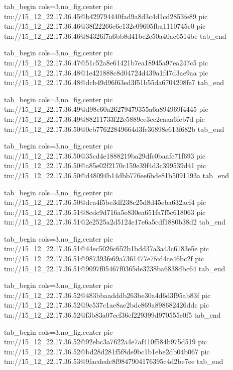  
 
 
 
 

\qqSecCmtScr


\ifcmt
  tab_begin cols=3,no_fig,center
    pic tm://15_12_22.17.36.45@b429794440fad9a8d3c4d1cd2853fe89
    pic tm://15_12_22.17.36.46@38f22266e6e132c09605fba1110745c0
    pic tm://15_12_22.17.36.46@84326f7a6bb8d41bc2c50a40ac6514be
  tab_end
\fi


\ifcmt
  tab_begin cols=3,no_fig,center
    pic tm://15_12_22.17.36.47@51c52a8e61421b7ea18945a97ea247c5
    pic tm://15_12_22.17.36.48@1e421888c8d04724d439a1f47d3ae9aa
    pic tm://15_12_22.17.36.48@dcb49d96f63ed3f51b55da6704208fe7
  tab_end
\fi


\ifcmt
  tab_begin cols=3,no_fig,center
    pic tm://15_12_22.17.36.49@d98c60a26279479355a6a894969f4445
    pic tm://15_12_22.17.36.49@88211733f22e5889ce3cc2caaa6feb7d
    pic tm://15_12_22.17.36.50@0cb77622849664d3fc36898e613f682b
  tab_end
\fi


\ifcmt
  tab_begin cols=3,no_fig,center
    pic tm://15_12_22.17.36.50@35cd4e1888219ba29dfc0baafc71f693
    pic tm://15_12_22.17.36.50@a85e02f2170c159e39f4d3c399539d41
    pic tm://15_12_22.17.36.50@d48094b14dbb776ee6bde81b5091193a
  tab_end
\fi


\ifcmt
  tab_begin cols=3,no_fig,center
    pic tm://15_12_22.17.36.50@dca4f5be3df238c25d8d45eba632acf4
    pic tm://15_12_22.17.36.51@8cdc9d716a5e830ea651fa7f5c618063
    pic tm://15_12_22.17.36.51@2e2525a2d5124e17e6a5cdf1880b38d2
  tab_end
\fi


\ifcmt
  tab_begin cols=3,no_fig,center
    pic tm://15_12_22.17.36.51@44ec5026c652b1bdd37a3a43c6183e5e
    pic tm://15_12_22.17.36.51@987393fe69a7361477e7fcd4ce46bc2f
    pic tm://15_12_22.17.36.51@9097f05467f0365de3238ba6838dbc64
  tab_end
\fi


\ifcmt
  tab_begin cols=3,no_fig,center
    pic tm://15_12_22.17.36.52@483bbaadddb263be30a4d6d3f95ab83f
    pic tm://15_12_22.17.36.52@9c537c1ae8ae2bdc869a898682426ddc
    pic tm://15_12_22.17.36.52@f3b83a07ecf36cf229399d970555e0f5
  tab_end
\fi


\ifcmt
  tab_begin cols=3,no_fig,center
    pic tm://15_12_22.17.36.52@92ebc3a7622a4e7af410f584b975d519
    pic tm://15_12_22.17.36.52@bd28d281f5f8de9bc1b1ebe2db04b067
    pic tm://15_12_22.17.36.53@9facdedc8f9847904176395c4d2be7ee
  tab_end
\fi



